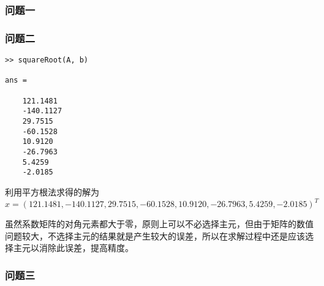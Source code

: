 \subsubsection{问题一}

\subsubsection{问题二}

\begin{lstlisting}[frame=single]
>> squareRoot(A, b)

ans =

    121.1481
    -140.1127
    29.7515
    -60.1528
    10.9120
    -26.7963
    5.4259
    -2.0185

\end{lstlisting}

利用平方根法求得的解为 $x = (121.1481, -140.1127, 29.7515, -60.1528, 10.9120, -26.7963, 5.4259, -2.0185)^T$

虽然系数矩阵的对角元素都大于零，原则上可以不必选择主元，但由于矩阵的数值问题较大，不选择主元的结果就是产生较大的误差，所以在求解过程中还是应该选择主元以消除此误差，提高精度。

\subsubsection{问题三}
